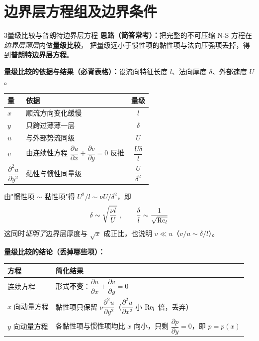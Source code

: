 \section{边界层方程组及边界条件}

\begin{kaodian}{3}{量级比较与普朗特边界层方程}
\textbf{思路（简答常考）：}把完整的不可压缩 N-S 方程在\emph{边界层薄层}内做\textbf{量级比较}，
把量级远小于惯性项的黏性项与法向压强项丢掉，得到\textbf{普朗特边界层方程}。

\textbf{量级比较的依据与结果（必背表格）：}设流向特征长度 $l$、法向厚度 $\delta$、外部速度 $U$。
\begin{center}
\begin{tabularx}{\textwidth}{@{}lXc@{}}
\toprule
量 & 依据 & 量级 \\
\midrule
$x$ & 顺流方向变化缓慢 & $l$ \\
$y$ & 只跨过薄薄一层 & $\delta$ \\
$u$ & 与外部势流同级 & $U$ \\
$v$ & 由连续性方程 $\dfrac{\partial u}{\partial x}+\dfrac{\partial v}{\partial y}=0$ 反推 &
$\dfrac{U\delta}{l}$ \\
$\dfrac{\partial^2 u}{\partial y^2}$ & 黏性与惯性同量级 & $\dfrac{U}{\delta^2}$ \\
\bottomrule
\end{tabularx}
\end{center}

由"惯性项 $\sim$ 黏性项"得 $U^2/l\sim\nu U/\delta^2$，即
\[ \delta\sim\sqrt{\frac{\nu l}{U}}\ ,\qquad \frac{\delta}{l}\sim\frac{1}{\sqrt{\mathrm{Re}_l}} \]
这同时\emph{证明了}边界层厚度与 $\sqrt{x}$ 成正比，也说明 $v\ll u$（$v/u\sim\delta/l$）。

\textbf{量级比较的结论（丢掉哪些项）：}
\begin{center}
\begin{tabularx}{\textwidth}{@{}lX@{}}
\toprule
方程 & 简化结果 \\
\midrule
连续方程 & 形式\textbf{不变}：$\dfrac{\partial u}{\partial x}+\dfrac{\partial v}{\partial y}=0$ \\
$x$ 向动量方程 & 黏性项只保留 $\nu\dfrac{\partial^2 u}{\partial y^2}$（$\dfrac{\partial^2 u}{\partial x^2}$ 小 $\mathrm{Re}_l$ 倍，丢弃） \\
$y$ 向动量方程 & 各黏性项与惯性项均比 $x$ 向小，只剩 $\dfrac{\partial p}{\partial y}=0$，即 $p=p(x)$ \\
\bottomrule
\end{tabularx}
\end{center}


\end{kaodian}
